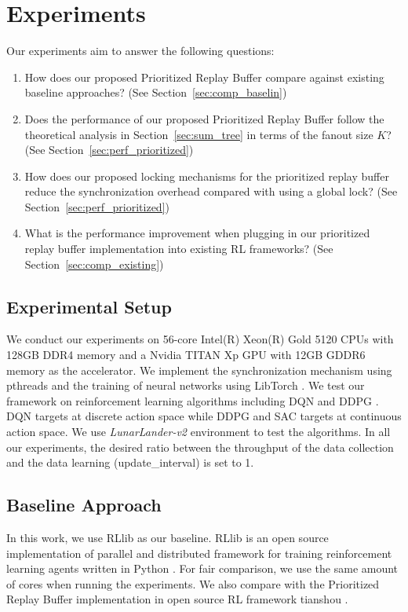 \section{Experiments}
Our experiments aim to answer the following questions:
\begin{enumerate}
    \item How does our proposed Prioritized Replay Buffer compare against existing baseline approaches? (See Section~\ref{sec:comp_baselin})
    \item Does the performance of our proposed Prioritized Replay Buffer follow the theoretical analysis in Section~\ref{sec:sum_tree} in terms of the fanout size $K$? (See Section~\ref{sec:perf_prioritized})
    \item How does our proposed locking mechanisms for the prioritized replay buffer reduce the synchronization overhead compared with using a global lock? (See Section~\ref{sec:perf_prioritized})
    \item What is the performance improvement when plugging in our prioritized replay buffer implementation into existing RL frameworks? (See Section~\ref{sec:comp_existing})
\end{enumerate}

\subsection{Experimental Setup}
We conduct our experiments on 56-core Intel(R) Xeon(R) Gold 5120 CPUs with 128GB DDR4 memory and a Nvidia TITAN Xp GPU with 12GB GDDR6 memory as the accelerator. We implement the synchronization mechanism using pthreads \cite{pthread} and the training of neural networks using LibTorch \cite{pytorch}. We test our framework on reinforcement learning algorithms including DQN \cite{dqn} and DDPG \cite{ddpg}. DQN targets at discrete action space while DDPG and SAC targets at continuous action space. We use \textit{LunarLander-v2} \cite{openai_gym} environment to test the algorithms. In all our experiments, the desired ratio between the throughput of the data collection and the data learning (update\_interval) is set to 1.

\subsection{Baseline Approach}
In this work, we use RLlib \cite{ray_rllib} as our baseline. RLlib is an open source implementation of parallel and distributed framework for training reinforcement learning agents written in Python \cite{python}. For fair comparison, we use the same amount of cores when running the experiments. We also compare with the Prioritized Replay Buffer implementation in open source RL framework tianshou \cite{tianshou}.

